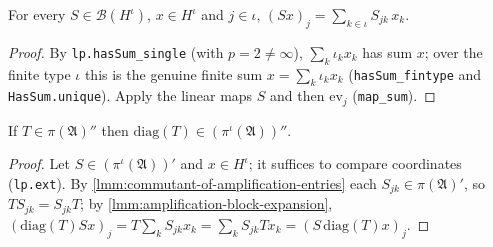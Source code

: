 \begin{lemma}
    \label{lmm:amplification-block-expansion}
    \leanok
    For every $S \in \mathcal{B}(H^\iota)$, $x \in H^\iota$ and $j \in \iota$, $(Sx)_j = \sum_{k \in \iota} S_{jk}\, x_k$.
\end{lemma}
\begin{proof}
    \leanok
    By \texttt{lp.hasSum\_single} (with $p = 2 \ne \infty$), $\sum_k \iota_k x_k$ has sum $x$; over the finite type $\iota$ this is the genuine finite sum $x = \sum_k \iota_k x_k$ (\texttt{hasSum\_fintype} and \texttt{HasSum.unique}). Apply the linear maps $S$ and then $\mathrm{ev}_j$ (\texttt{map\_sum}).
\end{proof}

\begin{lemma}
    \label{lmm:diagonal-in-amplified-bicommutant}
    \leanok
    If $T \in \pi(\mathfrak{A})''$ then $\mathrm{diag}(T) \in (\pi^\iota(\mathfrak{A}))''$.
\end{lemma}
\begin{proof}
    \leanok
    Let $S \in (\pi^\iota(\mathfrak{A}))'$ and $x \in H^\iota$; it suffices to compare coordinates (\texttt{lp.ext}). By \ref{lmm:commutant-of-amplification-entries} each $S_{jk} \in \pi(\mathfrak{A})'$, so $T S_{jk} = S_{jk} T$; by \ref{lmm:amplification-block-expansion}, $(\mathrm{diag}(T) S x)_j = T\sum_k S_{jk} x_k = \sum_k S_{jk} T x_k = (S\,\mathrm{diag}(T) x)_j$.
\end{proof}

